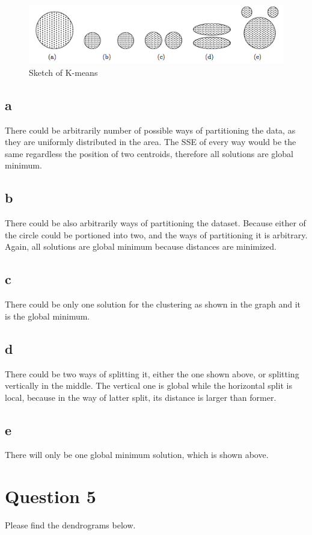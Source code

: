\documentclass[paper=a4, fontsize=11pt]{scrartcl} %
\begin{document}
\begin{figure}[htbp]
\begin{center}
\includegraphics[width=\textwidth]{hw3pic1}
\caption{Sketch of K-means}
\label{hw3pic1}
\end{center}
\end{figure}

\subsection*{a}

There could be arbitrarily number of possible ways of partitioning the data, as they are uniformly distributed in the area. The SSE of every way would be the same regardless the position of two centroids, therefore all solutions are global minimum.

\subsection*{b}

There could be also arbitrarily ways of partitioning the dataset. Because either of the circle could be portioned into two, and the ways of partitioning it is arbitrary. Again, all solutions are global minimum because distances are minimized.

\subsection*{c}

There could be only one solution for the clustering as shown in the graph and it is the global minimum. 

\subsection*{d}

There could be two ways of splitting it, either the one shown above, or splitting vertically in the middle. The vertical one is global while the horizontal split is local, because in the way of latter split, its distance is larger than former. 

\subsection*{e}

There will only be one global minimum solution, which is shown above.

\section*{Question 5}

Please find the dendrograms below.
\end{document}
